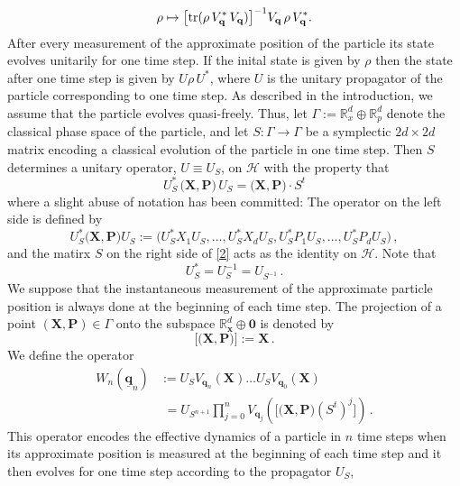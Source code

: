 \documentclass[11pt]{article}
\begin{document}
\begin{equation}\label{meas}
\rho \mapsto \big[ \text{tr}(\rho \,V_{\bf{q}}^{*}\, V_{\bf{q}})\big]^{-1} V_{\bf{q}}\, \rho\, V_{\bf{q}}^{*} .
\end{equation}
After every measurement of the approximate position of the particle its state evolves unitarily for one time step. If the 
inital state  is given by $\rho$ then the state after one time step is given by $U\rho\,U^{*}$, where $U$ is the unitary propagator of the particle corresponding to one time step. As described in the introduction, we assume that the particle evolves quasi-freely. Thus, let $\Gamma:= \mathbb{R}_{x}^{d}\oplus \mathbb{R}^{d}_{p}$ denote the classical phase space of the particle, and let $S: \Gamma \rightarrow \Gamma$ be a symplectic $2d \times 2d$ matrix encoding a 
classical evolution of the particle in one time step. Then $S$ determines a unitary operator, $U\equiv U_S$, on $\mathcal{H}$ with the property that
\begin{equation}\label{2}
U_{S}^{*}\,\big( \mathbf{X}, \mathbf{P} \big)\, U_{S}= \big(\mathbf{X}, \mathbf{P}\big)\cdot S^{t}
\end{equation}
where a slight abuse of notation has been committed: The operator on the left side is defined by
$$ U_S^{*} \big(\mathbf{X}, \mathbf{P} \big) U_{S}:= \Big(U_S^{*} X_1 U_S,\dots, U_S^{*} X_d U_S, 
U_S^{*} P_1 U_S, \dots, U_S^{*} P_d U_S\Big)\,,$$
and the matirx $S$ on the right side of \eqref{2} acts as the identity on $\mathcal{H}$. Note that 
$$U_S^{*}=U_S^{-1}=U_{S^{-1}}\,.$$
We suppose that the instantaneous measurement of the approximate particle position is always done at the beginning of each 
time step. The projection of a point $(\mathbf{X}, \mathbf{P})\in \Gamma$ onto the subspace 
$\mathbb{R}^{d}_{\mathbf{x}}\oplus{\mathbf{0}}$ is denoted by 
\begin{equation}\label{proj}
\big[\big(\mathbf{X}, \mathbf{P}\big)\big]:= \mathbf{X}\,. 
\end{equation}
We define the operator
\begin{align}\label{evolution}
W_{n}(\underline{\mathbf{q}}_{n})&:= U_S V_{\mathbf{q}_n}(\mathbf{X}) \dots U_S V_{\mathbf{q}_0}(\mathbf{X})\nonumber\\
 &\,\,= U_{S^{n+1}} \prod_{j=0}^{n} V_{\mathbf{q}_j}(\big[\big(\mathbf{X}, \mathbf{P}\big) (S^{t})^{j} \big])\,.
\end{align}
This operator encodes the effective dynamics of a particle in $n$ time steps when its approximate position 
is measured at the beginning of each time step and it then evolves for one time step according to the propagator $U_S$, 
\end{document}
